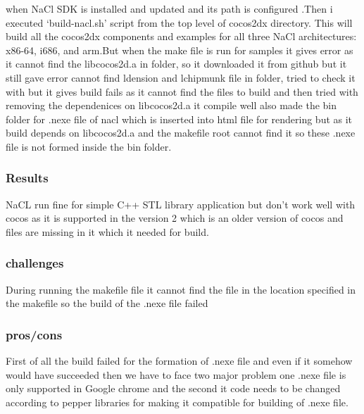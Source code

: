 \documentclass[23pt]{article}
\begin{document}
{\Large when NaCl SDK is installed and updated and its  path is configured .Then i executed ‘build-nacl.sh’ script from the top level of cocos2dx directory. This will build all the cocos2dx components and examples for all three NaCl architectures: x86-64, i686, and arm.But when the make file is run for samples it gives error as it cannot find the libcocos2d.a in  folder, so it downloaded it from github but it still gave error cannot find ldension  and lchipmunk file in  folder, tried to check it with  but it gives build fails as it cannot find the files to build and then tried with removing the dependenices on libcocos2d.a it compile well also made the bin folder for .nexe file of nacl which is inserted into html file for rendering but as it build depends on libcocos2d.a and the makefile root cannot find it so these .nexe file is not formed inside the bin folder. \par}

\subsubsection{Results}

{\Large NaCL run fine for simple C++ STL library application but don’t work well with cocos as it is supported in the version 2 which is an older version of cocos and files are missing in it which it needed for build. \par}


\subsubsection{challenges}

{\Large During running the makefile file it cannot find the file in the location specified in the makefile so the build of the .nexe file failed \par}

\subsubsection{pros/cons}

{\Large First of all the build failed for the formation of .nexe file and even if it somehow would have succeeded then we have to face two major problem one .nexe file is only supported in Google chrome and the second it code needs to be changed according to pepper libraries for making it compatible for building of .nexe file.}
\end{document}
